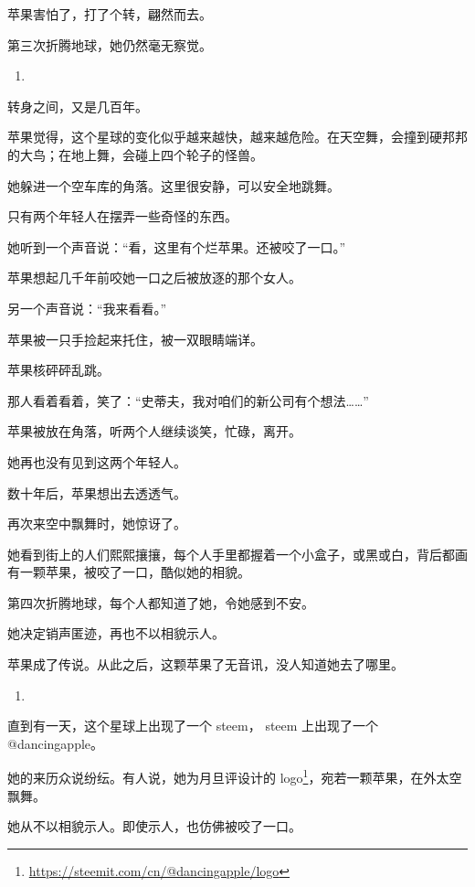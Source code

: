 \documentclass[]{ctexbook}
\renewcommand{\href}[2]{#2\footnote{\url{#1}}}
\begin{document}
苹果害怕了，打了个转，翩然而去。

第三次折腾地球，她仍然毫无察觉。

\begin{enumerate}
\def\labelenumi{(\arabic{enumi})}
\setcounter{enumi}{3}
\item
\end{enumerate}

转身之间，又是几百年。

苹果觉得，这个星球的变化似乎越来越快，越来越危险。在天空舞，会撞到硬邦邦的大鸟；在地上舞，会碰上四个轮子的怪兽。

她躲进一个空车库的角落。这里很安静，可以安全地跳舞。

只有两个年轻人在摆弄一些奇怪的东西。

她听到一个声音说：``看，这里有个烂苹果。还被咬了一口。''

苹果想起几千年前咬她一口之后被放逐的那个女人。

另一个声音说：``我来看看。''

苹果被一只手捡起来托住，被一双眼睛端详。

苹果核砰砰乱跳。

那人看着看着，笑了：``史蒂夫，我对咱们的新公司有个想法\ldots{}\ldots{}''

苹果被放在角落，听两个人继续谈笑，忙碌，离开。

她再也没有见到这两个年轻人。

数十年后，苹果想出去透透气。

再次来空中飘舞时，她惊讶了。

她看到街上的人们熙熙攘攘，每个人手里都握着一个小盒子，或黑或白，背后都画有一颗苹果，被咬了一口，酷似她的相貌。

第四次折腾地球，每个人都知道了她，令她感到不安。

她决定销声匿迹，再也不以相貌示人。

苹果成了传说。从此之后，这颗苹果了无音讯，没人知道她去了哪里。

\begin{enumerate}
\def\labelenumi{(\arabic{enumi})}
\setcounter{enumi}{4}
\item
\end{enumerate}

直到有一天，这个星球上出现了一个 steem， steem 上出现了一个 @dancingapple。

她的来历众说纷纭。有人说，她为月旦评\href{https://steemit.com/cn/@dancingapple/logo}{设计的 logo}，宛若一颗苹果，在外太空飘舞。

她从不以相貌示人。即使示人，也仿佛被咬了一口。
\end{document}
